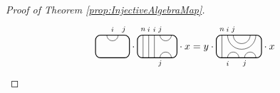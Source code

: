 \documentclass[11pt]{article}
\theoremstyle{plain}
\theoremstyle{definition}
\newcommand{\TLCapJoin}[5]{
 \TLTStart
 \TLTThrough{#1}
 \TLTCapJoin{#2}{#3}{#4}{#5}
 \TLTEnd
}
\newcommand{\TLTCalcLabelOffset}[3][0cm]{
 \settowidth{#2}{\scriptsize{$#3$}}
 \setlength{#2}{.5#2}
 \setlength{#2}{\maxof{#2}{#1}}
}
\newcommand{\TLTEnd}{
 \draw[thick, rounded corners = 5pt] (0,0) rectangle ($ (TLTlead) + (0,.8) $);
 \end{tikzpicture}
}
\newcommand{\TLTStart}{
 \begin{tikzpicture}[baseline=.3cm]
 \coordinate (TLTlead) at (.2,0); %
 \let\TLTlabelwidth\relax
 \newlength{\TLTlabelwidth}
}
\newcommand{\TLTThrough}[1]{
 \TLTCalcLabelOffset[.2cm]{\TLTlabelwidth}{#1}
 \coordinate (TLTlead) at ($ (TLTlead) + ({\TLTlabelwidth},0) $);
 \begin{scope}[shift=(TLTlead)]
  \draw (0,0) -- (0,.8);
  \node at (0,1) {\scriptsize{$#1$}};
 \end{scope}
  \coordinate (TLTlead) at ($ (TLTlead) + ({\TLTlabelwidth},0) $);
}
\newcommand{\TLTCapcup}[1]{
 \TLTCalcLabelOffset[.2cm]{\TLTlabelwidth}{#1}
  \coordinate (TLTlead) at ($ (TLTlead) + ({\TLTlabelwidth},0) $);
 \begin{scope}[shift=(TLTlead)]
  \draw (0,0) arc (180:0:.2);
  \draw (0,.8) arc (-180:0:.2);
  \node at (0,1) {\scriptsize{$#1$}};
 \end{scope}
 \TLTCalcLabelOffset[.5cm]{\TLTlabelwidth}{#1}
 \coordinate (TLTlead) at ($ (TLTlead) + ({\TLTlabelwidth},0)$);
}
\newcommand{\TLTCapJoin}[4]{
 \let\TLTjoinlwidth\relax
 \newlength{\TLTjoinlwidth}
 \let\TLTjoinrwidth\relax
 \newlength{\TLTjoinrwidth}
 \let\TLTsplitlwidth\relax
 \newlength{\TLTsplitlwidth}
 \let\TLTsplitrwidth\relax
 \newlength{\TLTsplitrwidth}
 \TLTCalcLabelOffset[.8cm]{\TLTjoinrwidth}{#4} %
 \TLTCalcLabelOffset[.15cm]{\TLTjoinlwidth}{#3} %
 \TLTCalcLabelOffset[.6cm]{\TLTsplitlwidth}{#1}
 \TLTCalcLabelOffset[.6cm]{\TLTsplitrwidth}{#2}
 \setlength{\TLTlabelwidth}{\maxof{\TLTjoinlwidth}{\TLTsplitlwidth}}
 \coordinate (TLTlead) at ($ (TLTlead) + ({\TLTlabelwidth},0) $);
 \setlength{\TLTlabelwidth}{\maxof{\TLTjoinrwidth}{\TLTsplitrwidth}} %
 \begin{scope}[shift=(TLTlead)]
  \draw (0,.8) arc (-180:0:.5);
  \draw (0.2,.8) arc (-180:0:.3);
  \draw (0,0) arc (180:0:.2);
  \draw ({\TLTsplitlwidth},0) arc (180:0:.2);
  \node at (0,1) {\scriptsize{$#4$}};
  \node at ({\TLTjoinlwidth},1) {\scriptsize{$#3$}};
  \node at (0,-.2) {\scriptsize{$#1$}};
  \node at ({\TLTsplitlwidth},-.2) {\scriptsize{$#2$}};
 \end{scope}
 \coordinate (TLTlead) at ($ (TLTlead) + ({\TLTlabelwidth},0) $);
}
\begin{document}
\begin{proof}[Proof of Theorem \ref{prop:InjectiveAlgebraMap}]
\begin{equation*}
\begin{tikzpicture}[baseline=.3cm]
  \node at (1,1) {\scriptsize{$j$}};
  \draw (.4,.8) arc (-180:0:.2cm);
  \node at (.6,1) {\scriptsize{$i$}};
  \draw[thick, rounded corners = 5pt] (0,0) rectangle (1.2,.8);
 \end{tikzpicture}
\cdot
 \begin{tikzpicture}[baseline=.3cm]
  \draw (.2,0) -- (.2,.8);
  \node at (.2,1) {\scriptsize{$n$}};
  \draw (.4,0) -- (.4,.8);
  \node at (.4,1) {\scriptsize{$i$}};
  \draw (.6,0) -- (.6,.8);
  \node at (.6,1) {\scriptsize{$i$}};
  \draw (.8,0) arc (180:0:.2cm);
  \node at (.8,-.2) {\scriptsize{$j$}};
  \draw (.8,.8) arc (-180:0:.2cm);
  \node at (.8,1) {\scriptsize{$j$}};
  \draw[thick, rounded corners = 5pt] (0,0) rectangle (1.4,.8);
 \end{tikzpicture}
\cdot x %
= y\cdot 
 \begin{tikzpicture}[baseline=.3cm]
  \draw (.2,0) -- (.2,.8);
  \node at (.2,1) {\scriptsize{$n$}};
  \draw (.4,0) arc (180:0:.2cm);
  \node at (.4,-.2) {\scriptsize{$i$}};
  \draw (1,0) arc (180:0:.2cm);
  \node at (1,-.2) {\scriptsize{$j$}};
  \draw (.4,.8) arc (-180:0:.5cm);
  \node at (.4,1) {\scriptsize{$i$}};
  \draw (.6,.8) arc (-180:0:.3cm);
  \node at (.6,1) {\scriptsize{$j$}};
  \draw[thick, rounded corners = 5pt] (0,0) rectangle (1.6,.8);
 \end{tikzpicture}
\cdot x %
\qedhere
\end{equation*}
\end{proof}
\end{document}
